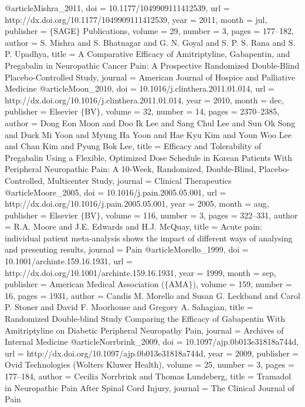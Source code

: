 @article{Mishra_2011,
	doi = {10.1177/1049909111412539},
	url = {http://dx.doi.org/10.1177/1049909111412539},
	year = 2011,
	month = {jul},
	publisher = {$\lbrace$SAGE$\rbrace$ Publications},
	volume = {29},
	number = {3},
	pages = {177--182},
	author = {S. Mishra and S. Bhatnagar and G. N. Goyal and S. P. S. Rana and S. P. Upadhya},
	title = {A Comparative Efficacy of Amitriptyline, Gabapentin, and Pregabalin in Neuropathic Cancer Pain: A Prospective Randomized Double-Blind Placebo-Controlled Study},
	journal = {American Journal of Hospice and Palliative Medicine}
}
@article{Moon_2010,
	doi = {10.1016/j.clinthera.2011.01.014},
	url = {http://dx.doi.org/10.1016/j.clinthera.2011.01.014},
	year = 2010,
	month = {dec},
	publisher = {Elsevier $\lbrace$BV$\rbrace$},
	volume = {32},
	number = {14},
	pages = {2370--2385},
	author = {Dong Eon Moon and Doo Ik Lee and Sang Chul Lee and Sun Ok Song and Duck Mi Yoon and Myung Ha Yoon and Hae Kyu Kim and Youn Woo Lee and Chan Kim and Pyung Bok Lee},
	title = {Efficacy and Tolerability of Pregabalin Using a Flexible, Optimized Dose Schedule in Korean Patients With Peripheral Neuropathic Pain: A 10-Week, Randomized, Double-Blind, Placebo-Controlled, Multicenter Study},
	journal = {Clinical Therapeutics}
}
@article{Moore_2005,
	doi = {10.1016/j.pain.2005.05.001},
	url = {http://dx.doi.org/10.1016/j.pain.2005.05.001},
	year = 2005,
	month = {aug},
	publisher = {Elsevier $\lbrace$BV$\rbrace$},
	volume = {116},
	number = {3},
	pages = {322--331},
	author = {R.A. Moore and J.E. Edwards and H.J. McQuay},
	title = {Acute pain: individual patient meta-analysis shows the impact of different ways of analysing and presenting results},
	journal = {Pain}
}
@article{Morello_1999,
	doi = {10.1001/archinte.159.16.1931},
	url = {http://dx.doi.org/10.1001/archinte.159.16.1931},
	year = 1999,
	month = {sep},
	publisher = {American Medical Association ($\lbrace$AMA$\rbrace$)},
	volume = {159},
	number = {16},
	pages = {1931},
	author = {Candis M. Morello and Susan G. Leckband and Carol P. Stoner and David F. Moorhouse and Gregory A. Sahagian},
	title = {Randomized Double-blind Study Comparing the Efficacy of Gabapentin With Amitriptyline on Diabetic Peripheral Neuropathy Pain},
	journal = {Archives of Internal Medicine}
}
@article{Norrbrink_2009,
	doi = {10.1097/ajp.0b013e31818a744d},
	url = {http://dx.doi.org/10.1097/ajp.0b013e31818a744d},
	year = 2009,
	publisher = {Ovid Technologies (Wolters Kluwer Health)},
	volume = {25},
	number = {3},
	pages = {177--184},
	author = {Cecilia Norrbrink and Thomas Lundeberg},
	title = {Tramadol in Neuropathic Pain After Spinal Cord Injury},
	journal = {The Clinical Journal of Pain}
}
